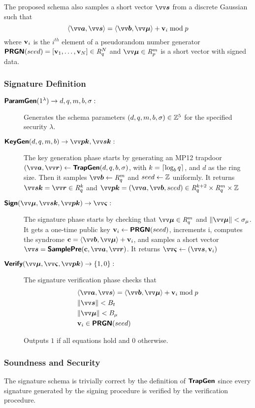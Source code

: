 The proposed schema also samples a short vector $\pv{s}$ from a discrete Gaussian such that
\[\inprod{\pv{a}}{\pv{s}}=\inprod{\pv{b}}{\pv{\mu}}+\pvv_i \bmod p\]
where $\mathbf{v}_i$ is the $i^{th}$ element of a pseudorandom number generator $\textsf{\textbf{PRGN}}(seed)= [\mathbf{v}_1,\ldots,\mathbf{v}_N] \in \mathit{R}_q^{N}$ and $\pv{\mu}\in\intring_p^m$ is a short vector with signed data.

\subsubsection{Signature Definition}
\begin{description}
\item[$\textsf{\textbf{ParamGen}}(1^{\lambda}) \to d,q,m,b,\sigma:$] Generates the schema parameters $(d,q,m,b,\sigma) \in\mathbb{Z}^5$ for the specified security $\lambda$. 
\item[$\bkw{KeyGen}(d,q,m,b) \to \pv{pk},\pv{sk}:$] The key generation phase starts by generating an MP12 trapdoor $(\pv{a},\pv{r}) \from \TrapGen(d,q,b,\sigma)$, with $k=\left\lceil \log_b q \right\rceil$, and $d$ as the ring size. Then it samples $\pv{b}\from \intring_q^m$ and $seed \leftarrow \mathbb{Z}$ uniformly. It returns $\pv{sk}=\pv{r} \in \intring_q^k$ and $\pv{pk}=(\pv{a},\pv{b},seed) \in \intring_q^{k+2}\times\intring_q^m\times\Z$
\item[$\bkw{Sign}(\pv{\mu}, \pv{sk}, \pv{pk}) \to \pv{\varsigma}:$] The signature phase starts by checking that $\pv{\mu} \in \intring_q^m$ and $\|\pv{\mu}\|<\sigma_{\mu}$. It gets a one-time public key $\mathbf{v}_i \leftarrow \textsf{\textbf{PRGN}}(seed)$, increments i, computes
the syndrome $\pc=\inprod{\pv{b}}{\pv{\mu}}+\pvv_i$, and samples a short vector $\pv{s}=\SamplePre(\pc,\pv{a},\pv{r})$. It returns $\pv{\varsigma} \from (\pv{s},\pvv_i)$
\item[$\bkw{Verify}(\pv{\mu},\pv{\varsigma},\pv{pk}) \to \{1,0\}:$] The signature verification phase checks that 
\begin{align}
    &\inprod{\pv{a}}{\pv{s}}=\inprod{\pv{b}}{\pv{\mu}}+\pvv_i \bmod p \label{eq:ver_a}\\
    &\|\pv{s}\|<B_t \label{eq:ver_b}\\
    &\|\pv{\mu}\|<B_{\mu} \label{eq:ver_c}\\
    &\pvv_i \in \PRGN(seed) \label{eq:ver_d}
\end{align} 

Outputs $1$ if all equations hold and $0$ otherwise.
\end{description}

\subsubsection{Soundness and Security}
The signature schema is trivially correct by the definition of $\textsf{\textbf{TrapGen}}$ since every signature generated by the signing procedure is verified by the verification procedure. 

